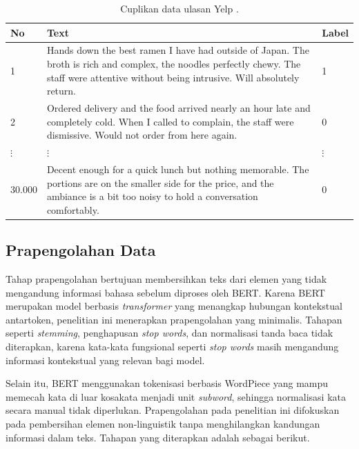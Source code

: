 \begin{table}[H]
    \centering
    \caption{Cuplikan data ulasan Yelp \parencite{zhang2015}.}
    \label{tab:yelp_sample}
    \begin{tabular}{p{} p{} p{}}
        \hline
        \textbf{No} & \textbf{Text} & \textbf{Label} \\
        \hline
        1 &
        Hands down the best ramen I have had outside of Japan. The broth
        is rich and complex, the noodles perfectly chewy. The staff were
        attentive without being intrusive. Will absolutely return. & 1 \\
        \hline
        2 &
        Ordered delivery and the food arrived nearly an hour late and
        completely cold. When I called to complain, the staff were
        dismissive. Would not order from here again. & 0 \\
        \hline
        $\vdots$ & $\vdots$ & $\vdots$ \\
        \hline
        30.000 &
        Decent enough for a quick lunch but nothing memorable. The portions
        are on the smaller side for the price, and the ambiance is a bit
        too noisy to hold a conversation comfortably. & 0 \\
        \hline
    \end{tabular}
\end{table}

\subsection{Prapengolahan Data}

Tahap prapengolahan bertujuan membersihkan teks dari elemen yang tidak
mengandung informasi bahasa sebelum diproses oleh BERT. Karena BERT
merupakan model berbasis \textit{transformer} yang menangkap hubungan
kontekstual antartoken, penelitian ini menerapkan prapengolahan yang
minimalis. Tahapan seperti \textit{stemming}, penghapusan \textit{stop words},
dan normalisasi tanda baca tidak diterapkan, karena kata-kata fungsional
seperti \textit{stop words} masih mengandung informasi kontekstual yang
relevan bagi model.

Selain itu, BERT menggunakan tokenisasi berbasis WordPiece yang mampu memecah
kata di luar kosakata menjadi unit \textit{subword}, sehingga normalisasi kata
secara manual tidak diperlukan. Prapengolahan pada penelitian ini difokuskan
pada pembersihan elemen non-linguistik tanpa menghilangkan kandungan informasi
dalam teks. Tahapan yang diterapkan adalah sebagai berikut.

